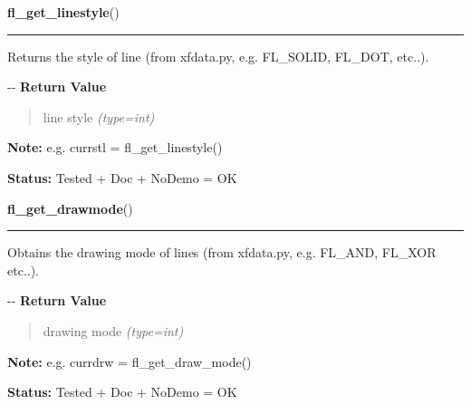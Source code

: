     \label{xformslib:flxbasic:fl_get_linestyle}

    \vspace{0.5ex}

\hspace{.8\funcindent}\begin{boxedminipage}{\funcwidth}

    \raggedright \textbf{fl\_get\_linestyle}()

    \vspace{-1.5ex}

    \rule{\textwidth}{0.5\fboxrule}
\setlength{\parskip}{2ex}

Returns the style of line (from xfdata.py, e.g. FL\_SOLID, FL\_DOT,
etc..).

-{}-
\setlength{\parskip}{1ex}
      \textbf{Return Value}
    \vspace{-1ex}

      \begin{quote}

line style
      {\it (type=int)}

      \end{quote}

\textbf{Note:} 
e.g. currstl = fl\_get\_linestyle()


\textbf{Status:} 
Tested + Doc + NoDemo = OK


    \end{boxedminipage}

    \label{xformslib:flxbasic:fl_get_drawmode}

    \vspace{0.5ex}

\hspace{.8\funcindent}\begin{boxedminipage}{\funcwidth}

    \raggedright \textbf{fl\_get\_drawmode}()

    \vspace{-1.5ex}

    \rule{\textwidth}{0.5\fboxrule}
\setlength{\parskip}{2ex}

Obtains the drawing mode of lines (from xfdata.py, e.g. FL\_AND, FL\_XOR
etc..).

-{}-
\setlength{\parskip}{1ex}
      \textbf{Return Value}
    \vspace{-1ex}

      \begin{quote}

drawing mode
      {\it (type=int)}

      \end{quote}

\textbf{Note:} 
e.g. currdrw = fl\_get\_draw\_mode()


\textbf{Status:} 
Tested + Doc + NoDemo = OK


    \end{boxedminipage}

